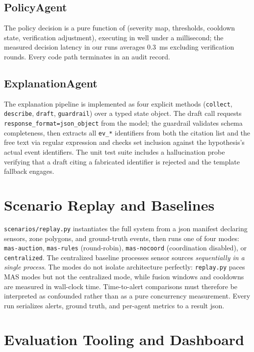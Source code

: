 \subsection{PolicyAgent}

The policy decision is a pure function of (severity map, thresholds, cooldown state, verification adjustment), executing in well under a millisecond; the measured decision latency in our runs averages 0.3~ms excluding verification rounds. Every code path terminates in an audit record.

\subsection{ExplanationAgent}

The explanation pipeline is implemented as four explicit methods (\texttt{collect}, \texttt{describe}, \texttt{draft}, \texttt{guardrail}) over a typed state object. The draft call requests \texttt{response\_format=json\_object} from the model; the guardrail validates schema completeness, then extracts all \texttt{ev\_*} identifiers from both the citation list and the free text via regular expression and checks set inclusion against the hypothesis's actual event identifiers. The unit test suite includes a hallucination probe verifying that a draft citing a fabricated identifier is rejected and the template fallback engages.

\section{Scenario Replay and Baselines}

\texttt{scenarios/replay.py} instantiates the full system from a \gls{json} manifest declaring sensors, zone polygons, and ground-truth events, then runs one of four modes: \texttt{mas-auction}, \texttt{mas-rules} (round-robin), \texttt{mas-nocoord} (coordination disabled), or \texttt{centralized}. The centralized baseline processes sensor sources \emph{sequentially in a single process}. The modes do not isolate architecture perfectly: \texttt{replay.py} paces MAS modes but not the centralized mode, while fusion windows and cooldowns are measured in wall-clock time. Time-to-alert comparisons must therefore be interpreted as confounded rather than as a pure concurrency measurement. Every run serializes alerts, ground truth, and per-agent metrics to a result \gls{json}.

\section{Evaluation Tooling and Dashboard}

